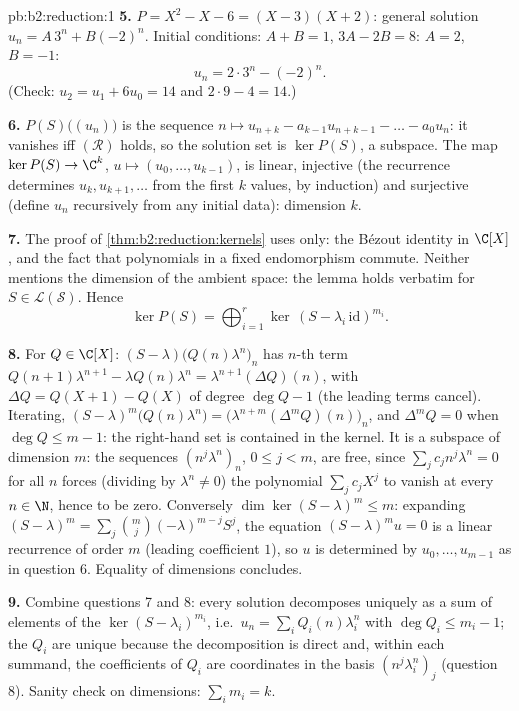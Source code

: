 \begin{solution}{pb:b2:reduction:1}
\textbf{5.} $P = X^2 - X - 6 = (X - 3)(X + 2)$: general solution
$u_n = A\,3^n + B(-2)^n$. Initial conditions: $A + B = 1$, $3A -
2B = 8$: $A = 2$, $B = -1$:
\[
u_n = 2\cdot 3^n - (-2)^n .
\]
(Check: $u_2 = u_1 + 6u_0 = 14$ and $2\cdot9 - 4 = 14$.)

\textbf{6.} $P(S)\bigl((u_n)\bigr)$ is the sequence $n \mapsto
u_{n+k} - a_{k-1}u_{n+k-1} - \dots - a_0u_n$: it vanishes iff
$(\mathcal R)$ holds, so the solution set is $\ker P(S)$, a
subspace. The map $\ker P(S) \to \C^k$, $u \mapsto (u_0, \dots,
u_{k-1})$, is linear, injective (the recurrence determines
$u_{k}, u_{k+1}, \dots$ from the first $k$ values, by induction)
and surjective (define $u_n$ recursively from any initial data):
dimension $k$.

\textbf{7.} The proof of \cref{thm:b2:reduction:kernels} uses
only: the Bézout identity in $\C[X]$, and the fact that
polynomials in a fixed endomorphism commute. Neither mentions
the dimension of the ambient space: the lemma holds verbatim for
$S \in \mathcal{L}(\mathcal{S})$. Hence
\[
\ker P(S) = \bigoplus_{i=1}^{r}
\ker\,(S - \lambda_i\,\mathrm{id})^{m_i}.
\]

\textbf{8.} For $Q \in \C[X]$: $(S -
\lambda)\bigl(Q(n)\lambda^n\bigr)_n$ has $n$-th term
$Q(n{+}1)\lambda^{n+1} - \lambda Q(n)\lambda^n =
\lambda^{n+1}(\Delta Q)(n)$, with $\Delta Q = Q(X{+}1) - Q(X)$
of degree $\deg Q - 1$ (the leading terms cancel). Iterating,
$(S - \lambda)^m\bigl(Q(n)\lambda^n\bigr) =
\bigl(\lambda^{n+m}(\Delta^m Q)(n)\bigr)_n$, and $\Delta^m Q = 0$
when $\deg Q \leq m - 1$: the right-hand set is contained in the
kernel. It is a subspace of dimension $m$: the sequences
$(n^j\lambda^n)_n$, $0 \leq j < m$, are free, since
$\sum_j c_j n^j\lambda^n = 0$ for all $n$ forces (dividing by
$\lambda^n \neq 0$) the polynomial $\sum_j c_jX^j$ to vanish at
every $n \in \N$, hence to be zero. Conversely $\dim\ker(S -
\lambda)^m \leq m$: expanding $(S - \lambda)^m = \sum_j
\binom mj(-\lambda)^{m-j}S^j$, the equation $(S - \lambda)^m u =
0$ is a linear recurrence of order $m$ (leading coefficient
$1$), so $u$ is determined by $u_0, \dots, u_{m-1}$ as in
question 6. Equality of dimensions concludes.

\textbf{9.} Combine questions 7 and 8: every solution decomposes
uniquely as a sum of elements of the $\ker(S -
\lambda_i)^{m_i}$, i.e.\ $u_n = \sum_i Q_i(n)\lambda_i^n$ with
$\deg Q_i \leq m_i - 1$; the $Q_i$ are unique because the
decomposition is direct and, within each summand, the
coefficients of $Q_i$ are coordinates in the basis
$(n^j\lambda_i^n)_j$ (question 8). Sanity check on dimensions:
$\sum_i m_i = k$.


\end{solution}
